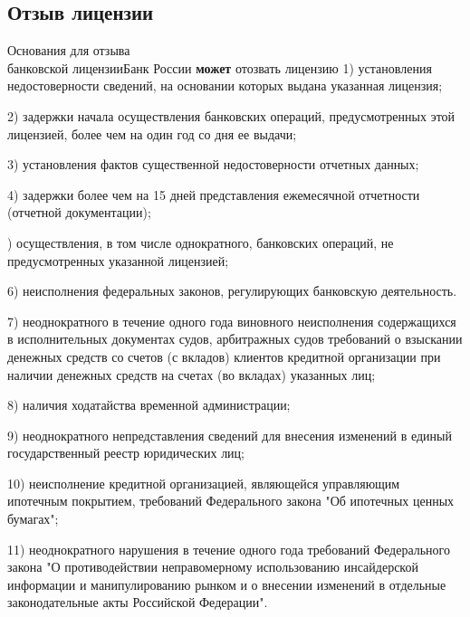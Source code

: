 \documentclass[_Banking_p1.tex]{subfiles}
\begin{document}
\subsection{Отзыв лицензии}
\begin{frame}[allowframebreaks]{Основания для отзыва \\ банковской лицензии}{Банк России \textbf{может} отозвать лицензию}
1) установления недостоверности сведений, на основании которых выдана указанная лицензия;

2) задержки начала осуществления банковских операций, предусмотренных этой лицензией, более чем на один год со дня ее выдачи;

3) установления фактов существенной недостоверности отчетных данных;

4) задержки более чем на 15 дней представления ежемесячной отчетности (отчетной документации);

) осуществления, в том числе однократного, банковских операций, не предусмотренных указанной лицензией;

6) неисполнения федеральных законов, регулирующих банковскую деятельность.

7) неоднократного в течение одного года виновного неисполнения содержащихся в исполнительных документах судов, арбитражных судов требований о взыскании денежных средств со счетов (с вкладов) клиентов кредитной организации при наличии денежных средств на счетах (во вкладах) указанных лиц;

8) наличия ходатайства временной администрации;
\pagebreak

9) неоднократного непредставления сведений для внесения изменений в единый государственный реестр юридических лиц;

10) неисполнение кредитной организацией, являющейся управляющим ипотечным покрытием, требований Федерального закона "Об ипотечных ценных бумагах";

11) неоднократного нарушения в течение одного года требований Федерального закона "О противодействии неправомерному использованию инсайдерской информации и манипулированию рынком и о внесении изменений в отдельные законодательные акты Российской Федерации".

\end{frame}
\end{document}
